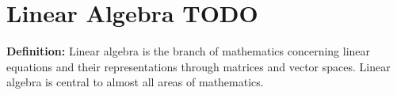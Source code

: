 \chapter{Linear Algebra TODO}
\textbf{Definition:} Linear algebra is the branch of mathematics concerning linear equations and their representations through matrices and vector spaces. Linear algebra is central to almost all areas of mathematics.